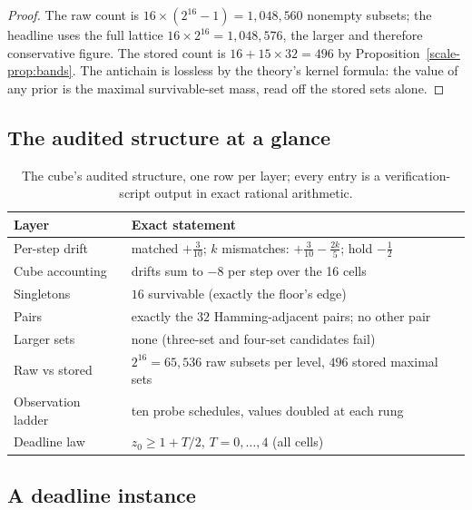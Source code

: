 \documentclass[10pt,twocolumn]{article}
\theoremstyle{plain}
\theoremstyle{definition}
\theoremstyle{remark}
\begin{document}
\begin{proof}
The raw count is \(16 \times (2^{16} - 1) = 1{,}048{,}560\) nonempty
subsets; the headline uses the full lattice
\(16 \times 2^{16} = 1{,}048{,}576\), the larger and therefore
conservative figure. The stored count is
\(16 + 15 \times 32 = 496\) by Proposition~\ref{scale-prop:bands}. The
antichain is lossless by the theory's kernel formula: the
value of any prior is the maximal survivable-set mass, read off the
stored sets alone.
\end{proof}

\subsection{The audited structure at a glance}\label{scale-glance}

\begin{table}[t]
\centering\footnotesize
\caption{The cube's audited structure, one row per layer; every entry is a
verification-script output in exact rational arithmetic.}
\label{scale-tab:glance}
\begin{tabular}{@{}l p{4.9cm}@{}}
\toprule
Layer & Exact statement \\
\midrule
Per-step drift & matched $+\tfrac3{10}$; $k$ mismatches: $+\tfrac3{10}-\tfrac{2k}{5}$; hold $-\tfrac12$ \\
Cube accounting & drifts sum to $-8$ per step over the 16 cells \\
Singletons & $16$ survivable (exactly the floor's edge) \\
Pairs & exactly the $32$ Hamming-adjacent pairs; no other pair \\
Larger sets & none (three-set and four-set candidates fail) \\
Raw vs stored & $2^{16} = 65{,}536$ raw subsets per level, $496$ stored maximal sets \\
Observation ladder & ten probe schedules, values doubled at each rung \\
Deadline law & $z_0 \ge 1 + T/2$, $T = 0, \dots, 4$ (all cells) \\
\bottomrule
\end{tabular}
\end{table}

\subsection{A deadline instance}\label{scale-deadline}
\end{document}
